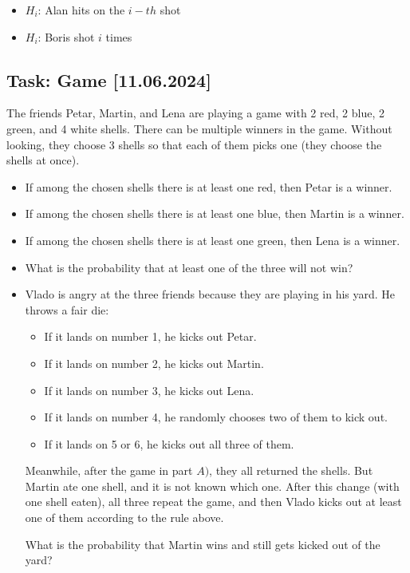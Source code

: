 \documentclass[a4paper, 12pt]{article}
\begin{document}
\begin{itemize}
    \item [a)] $H_i$: Alan hits on the $i-th$ shot
    \item [b)] $H_i$: Boris shot $i$ times

\end{itemize}


\subsection*{Task: Game [11.06.2024]}

The friends Petar, Martin, and Lena are playing a game with 2 red, 2 blue, 2 green, and 4 white shells. There can be multiple winners in the game. Without looking, they choose 3 shells so that each of them picks one (they choose the shells at once).

\begin{itemize}
    \item If among the chosen shells there is at least one red, then Petar is a winner.

    \item If among the chosen shells there is at least one blue, then Martin is a winner.

    \item If among the chosen shells there is at least one green, then Lena is a winner.
\end{itemize}

\begin{itemize}
    \item [a)] What is the probability that at least one of the three will not win?

    \item [b)] Vlado is angry at the three friends because they are playing in his yard. He throws a fair die:

\begin{itemize}
    \item If it lands on number 1, he kicks out Petar.

    \item If it lands on number 2, he kicks out Martin.

    \item If it lands on number 3, he kicks out Lena.

    \item If it lands on number 4, he randomly chooses two of them to kick out.

    \item If it lands on 5 or 6, he kicks out all three of them.
\end{itemize}

Meanwhile, after the game in part $A)$, they all returned the shells. But Martin ate one shell, and it is not known which one. After this change (with one shell eaten), all three repeat the game, and then Vlado kicks out at least one of them according to the rule above.

What is the probability that Martin wins and still gets kicked out of the yard?
\end{itemize}
\end{document}

